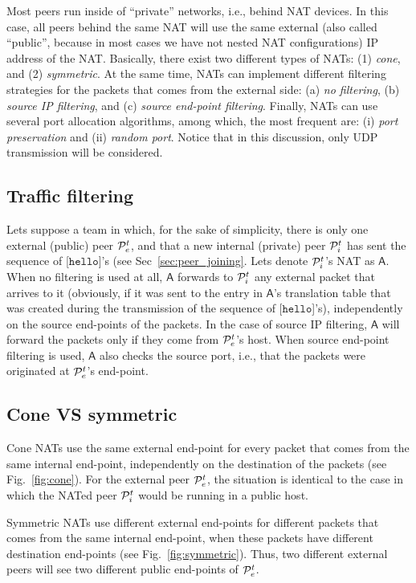 
Most peers run inside of ``private'' networks, i.e., behind NAT
devices. In this case, all peers behind the same NAT will use the same
external (also called ``public'', because in most cases we have not
nested NAT configurations) IP address of the NAT. Basically, there
exist two different types of NATs: (1) \emph{cone}, and (2)
\emph{symmetric}. At the same time, NATs can implement different
filtering strategies for the packets that comes from the external
side: (a) \emph{no filtering}, (b) \emph{source IP filtering}, and (c)
\emph{source end-point filtering}. Finally, NATs can use several port
allocation algorithms, among which, the most frequent are: (i)
\emph{port preservation} and (ii) \emph{random port}. Notice that in
this discussion, only UDP transmission will be considered.

\subsection{Traffic filtering}
Lets suppose a team in which, for the sake of simplicity, there is
only one external (public) peer ${\cal P}^t_e$, and that a new
internal (private) peer ${\cal P}^t_i$ has sent the sequence of
[$\mathtt{hello}$]'s (see Sec~\ref{sec:peer_joining}. Lets denote
${\cal P}^t_i$'s NAT as $\mathsf{A}$. When no filtering is used at
all, $\mathsf{A}$ forwards to ${\cal P}^t_i$ any external packet that
arrives to it (obviously, if it was sent to the entry in
$\mathsf{A}$'s translation table that was created during the
transmission of the sequence of [$\mathtt{hello}$]'s), independently
on the source end-points of the packets. In the case of source IP
filtering, $\mathsf{A}$ will forward the packets only if they come
from ${\cal P}^t_e$'s host.  When source end-point filtering is used,
$\mathsf{A}$ also checks the source port, i.e., that the packets were
originated at ${\cal P}^t_e$'s end-point.

\subsection{Cone VS symmetric}
Cone NATs use the same external end-point for every packet that comes
from the same internal end-point, independently on the destination of
the packets (see Fig.~\ref{fig:cone}). For the external peer ${\cal
  P}^t_e$, the situation is identical to the case in which the NATed
peer ${\cal P}^t_i$ would be running in a public host.

Symmetric NATs use different external end-points for different packets
that comes from the same internal end-point, when these packets have
different destination end-points (see Fig.~\ref{fig:symmetric}). Thus,
two different external peers will see two different public end-points
of ${\cal P}^t_e$.

